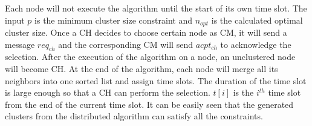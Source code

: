 Each node will not execute the algorithm until the start of its own time slot. The input \(p\) is the minimum cluster size constraint and \(n_{opt}\) is the calculated optimal cluster size. Once a CH decides to choose certain node as CM, it will send a message \(req_{ch}\) and the corresponding CM will send \(acpt_{ch}\) to acknowledge the selection. After the execution of the algorithm on a node, an unclustered node will become CH. At the end of the algorithm, each node will merge all its neighbors into one sorted list and assign time slots. The duration of the time slot is large enough so that a CH can perform the selection. \(t[i]\) is the \(i^{th}\) time slot from the end of the current time slot. It can be easily seen that the generated clusters from the distributed algorithm can satisfy all the constraints.

\begin{comment}
Informally, it can be easily shown that the distributed algorithm is correct as the solution it produces will satisfy all the constraints:
\begin{itemize}
\item Since all nodes will be given a time slot to do run the algorithm, the clusters will eventually cover the whole network.
\item The clustering starts at the controller node and all the later CHs will first select a CM from its \(cn\). Therefore, all the clusters will be connected.
\item CH only selects CM within its one-hop neighbors, and the CHs will not remove its role as CH so all clusters will be one-hop.
\item For each CH, it will ensure the cluster size is at least \(p\) by selecting additional CM until the cluster size reaches either \(p\) or \(n_{opt}\).
\end{itemize}
\end{comment}